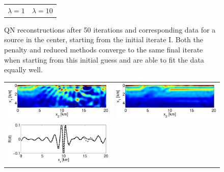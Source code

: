 \documentclass{iopart}
\begin{document}
{\begin{figure}
\begin{tabular}{cc}
{\small $\lambda=1$}&
{\small $\lambda=10$}\\
\end{tabular}
\caption{QN reconstructions after 50 iterations and corresponding data for a source in the center, starting from the initial iterate I. Both the penalty and reduced methods converge to the same final iterate when starting from this initial guess and are able to fit the data equally well.}
\label{fig:2D_overthrust1}
\end{figure}

\begin{figure}
\centering
\begin{tabular}{cc}
\includegraphics[scale=.3]{./figs/2D_overthrust2_g}&
\includegraphics[scale=.3]{./figs/2D_overthrust2_h}\\
\includegraphics[scale=.3]{./figs/2D_overthrust2_l}&

\end{tabular}
\end{figure}}
\end{document}
